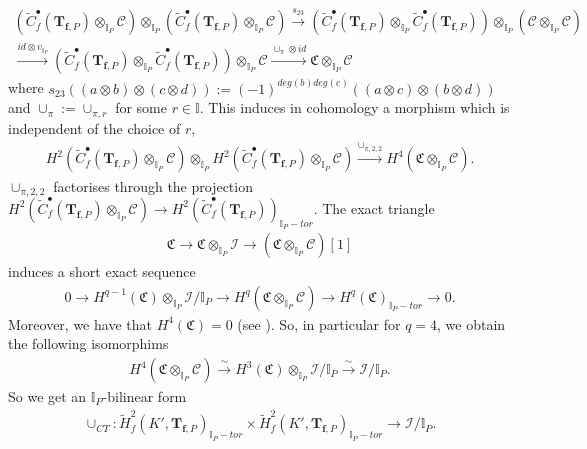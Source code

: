 \documentclass[reqno,10pt]{amsart}
\newcommand{\I}{\mathbb{I}}
\newcommand{\ip}{\I_P}
\newcommand{\tfp}{\mathbf{T}_{\mathbf{f},P}}
\theoremstyle{plain}
\theoremstyle{definition}
\begin{document}
\begin{align*}
    \left(\widetilde{C}^\bullet_f(\tfp) \otimes_{\ip} \mathcal{C} \right) \otimes_{\ip} \left(\widetilde{C}^\bullet_f(\tfp) \otimes_{\ip} \mathcal{C} \right) \xrightarrow{s_{23}} \left(\widetilde{C}^\bullet_f(\tfp) \otimes_{\ip} \widetilde{C}^\bullet_f(\tfp) \right) \otimes_{\ip} \left(\mathcal{C} \otimes_{\ip} \mathcal{C} \right) \\ \xrightarrow{id \otimes v_{\ip}}\left(\widetilde{C}^\bullet_f(\tfp) \otimes_{\ip} \widetilde{C}^\bullet_f(\tfp) \right) \otimes_{\ip} \mathcal{C} \xrightarrow{\cup_\pi \otimes id} \mathfrak{C} \otimes_{\ip} \mathcal{C}
\end{align*}
where $s_{23}((a \otimes b) \otimes (c \otimes d)) := (-1)^{deg(b)deg(c)}((a \otimes c) \otimes (b \otimes d))$ and $\cup_\pi := \cup_{\pi,r}$ for some $r \in \I$. This induces in cohomology a morphism which is independent of the choice of $r$,
\begin{align*}
    H^2(\widetilde{C}^\bullet_f(\tfp) \otimes_{\ip} \mathcal{C}) \otimes_{\ip} H^2(\widetilde{C}^\bullet_f(\tfp) \otimes_{\ip} \mathcal{C}) \xrightarrow{\cup_{\pi,2,2}} H^4(\mathfrak{C} \otimes_{\ip} \mathcal{C}). 
\end{align*}
$\cup_{\pi,2,2}$ factorises through the projection $H^2(\widetilde{C}^\bullet_f(\tfp) \otimes_{\ip} \mathcal{C}) \rightarrow H^2(\widetilde{C}^\bullet_f(\tfp))_{\ip-tor}$. The exact triangle
\begin{align*}
    \mathfrak{C} \rightarrow \mathfrak{C} \otimes_{\ip} \mathscr{I} \rightarrow (\mathfrak{C} \otimes_{\ip} \mathcal{C})[1]
\end{align*}
induces a short exact sequence
    \begin{align} \label{ses}
        0 \rightarrow H^{q-1}(\mathfrak{C}) \otimes_{\I_P} \mathscr{I}/\I_P \rightarrow H^q(\mathfrak{C} \otimes_{\I_P} \mathcal{C}) \rightarrow H^q(\mathfrak{C})_{\I_P-tor} \rightarrow 0.
    \end{align}
Moreover, we have that $H^4(\mathfrak{C}) = 0$ (see \cite[Section 5.4.1]{Nekovar}). So, in particular for $q = 4$, we obtain the following isomorphims
\begin{align*}
    H^4(\mathfrak{C} \otimes_{\ip} \mathcal{C}) \xrightarrow{\sim} H^3(\mathfrak{C}) \otimes_{\ip} \mathscr{I}/\ip \xrightarrow{\sim} \mathscr{I}/\ip.
\end{align*}
So we get an $\ip$-bilinear form
\begin{align} \label{Cassels Tate Pairing}
    \cup_{CT} : \widetilde{H}^2_f(K',\tfp)_{\ip-tor} \times \widetilde{H}^2_f(K',\tfp)_{\ip-tor} \rightarrow \mathscr{I}/\ip.
\end{align}
\end{document}
